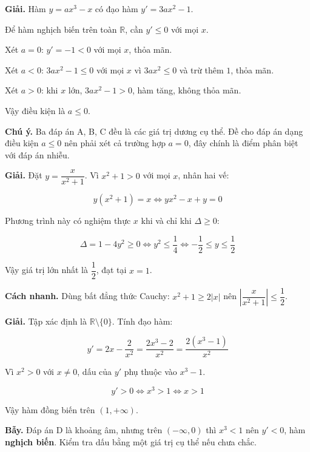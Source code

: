 \documentclass[11pt, a4paper]{article}
\begin{document}
\begin{dapan}[10 — Đáp án D]
\textbf{Giải.} Hàm $y = ax^3 - x$ có đạo hàm $y' = 3ax^2 - 1$.

Để hàm nghịch biến trên toàn $\mathbb{R}$, cần $y' \le 0$ với mọi $x$.

Xét $a = 0$: $y' = -1 < 0$ với mọi $x$, thỏa mãn.

Xét $a < 0$: $3ax^2 - 1 \le 0$ với mọi $x$ vì $3ax^2 \le 0$ và trừ thêm $1$, thỏa mãn.

Xét $a > 0$: khi $x$ lớn, $3ax^2 - 1 > 0$, hàm tăng, không thỏa mãn.

Vậy điều kiện là $a \le 0$.

\textbf{Chú ý.} Ba đáp án A, B, C đều là các giá trị dương cụ thể. Đề cho đáp án dạng điều kiện $a \le 0$ nên phải xét cả trường hợp $a = 0$, đây chính là điểm phân biệt với đáp án nhiễu.
\end{dapan}

\begin{dapan}[11 — Đáp án B]
\textbf{Giải.} Đặt $y = \dfrac{x}{x^2+1}$. Vì $x^2 + 1 > 0$ với mọi $x$, nhân hai vế:

$$y(x^2 + 1) = x \iff yx^2 - x + y = 0$$

Phương trình này có nghiệm thực $x$ khi và chỉ khi $\Delta \ge 0$:

$$\Delta = 1 - 4y^2 \ge 0 \iff y^2 \le \frac{1}{4} \iff -\frac{1}{2} \le y \le \frac{1}{2}$$

Vậy giá trị lớn nhất là $\dfrac{1}{2}$, đạt tại $x = 1$.

\textbf{Cách nhanh.} Dùng bất đẳng thức Cauchy: $x^2 + 1 \ge 2|x|$ nên $\left|\dfrac{x}{x^2+1}\right| \le \dfrac{1}{2}$.
\end{dapan}

\begin{dapan}[12 — Đáp án C]
\textbf{Giải.} Tập xác định là $\mathbb{R}\setminus\{0\}$. Tính đạo hàm:

$$y' = 2x - \frac{2}{x^2} = \frac{2x^3 - 2}{x^2} = \frac{2(x^3-1)}{x^2}$$

Vì $x^2 > 0$ với $x \neq 0$, dấu của $y'$ phụ thuộc vào $x^3 - 1$.

$$y' > 0 \iff x^3 > 1 \iff x > 1$$

Vậy hàm đồng biến trên $(1, +\infty)$.

\textbf{Bẫy.} Đáp án D là khoảng âm, nhưng trên $(-\infty,0)$ thì $x^3 < 1$ nên $y' < 0$, hàm \textbf{nghịch biến}. Kiểm tra dấu bằng một giá trị cụ thể nếu chưa chắc.
\end{dapan}
\end{document}
